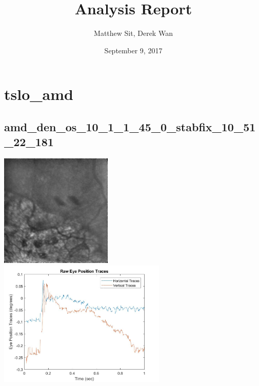 \documentclass[11pt]{article}
\begin{document}
\title{Analysis Report}
\author{Matthew Sit, Derek Wan}
\date{September 9, 2017}
\maketitle

\section{tslo\_amd}

\subsection{amd\_den\_os\_10\_1\_1\_45\_0\_stabfix\_10\_51\_22\_181}
\includegraphics[width=0.40\textwidth, valign=m]{referenceframes/tslo_amd/amd_den_os_10_1_1_45_0_stabfix_10_51_22_181_dwt_nostim_gamscaled_bandfilt_refframe.jpg}
\includegraphics[width=0.60\textwidth, valign=m]{eyepositiontraces/tslo_amd/amd_den_os_10_1_1_45_0_stabfix_10_51_22_181.jpg}\\
\end{document}
